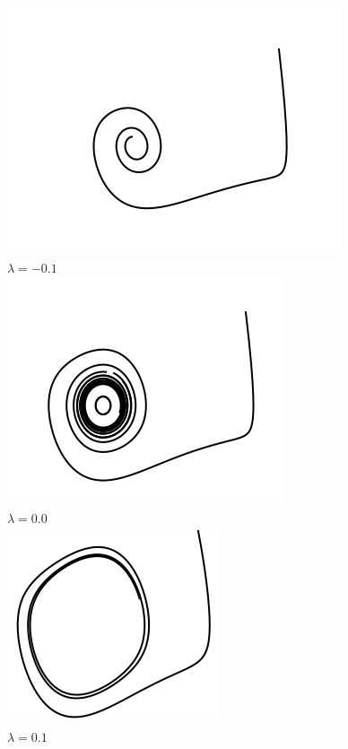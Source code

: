 \begin{figure}[!ht] \centering
	\includegraphics[scale=0.35]{figures/vanderpol-hopfbifurcation--0_1.png} \\ $\lambda = -0.1$ \\
	\includegraphics[scale=0.35]{figures/vanderpol-hopfbifurcation-0_0.png} \\ $\lambda = 0.0$ \\
	\includegraphics[scale=0.35]{figures/vanderpol-hopfbifurcation-0_1.png} \\ $\lambda = 0.1$ \\

\end{figure}
